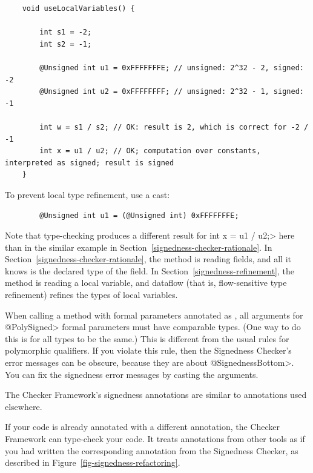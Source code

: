 \begin{Verbatim}
    void useLocalVariables() {

        int s1 = -2;
        int s2 = -1;

        @Unsigned int u1 = 0xFFFFFFFE; // unsigned: 2^32 - 2, signed: -2
        @Unsigned int u2 = 0xFFFFFFFF; // unsigned: 2^32 - 1, signed: -1

        int w = s1 / s2; // OK: result is 2, which is correct for -2 / -1
        int x = u1 / u2; // OK; computation over constants, interpreted as signed; result is signed
    }
\end{Verbatim}

To prevent local type refinement, use a cast:
\begin{Verbatim}
        @Unsigned int u1 = (@Unsigned int) 0xFFFFFFFE;
\end{Verbatim}

Note that type-checking produces a different result for \<int x = u1 / u2;>
here than in the similar example in
Section~\ref{signedness-checker-rationale}.  In
Section~\ref{signedness-checker-rationale}, the method is reading fields,
and all it knows is the declared type of the field.  In
Section~\ref{signedness-refinement}, the method is
reading a local variable, and dataflow (that is, flow-sensitive type
refinement) refines the types of local variables.



When calling a method with formal parameters annotated as
, all arguments for
\<@PolySigned> formal parameters must have comparable types.  (One way to
do this is for all types to be the same.)  This is different from the usual
rules for polymorphic qualifiers.  If you violate this rule, then the
Signedness Checker's error messages can be obscure, because they are about
\<@SignednessBottom>.  You can fix the signedness error messages by casting
the arguments.



The Checker Framework's signedness annotations are similar to annotations used
elsewhere.

If your code is already annotated with a different
annotation, the Checker Framework can type-check your code.
It treats annotations from other tools
as if you had written the corresponding annotation from the
Signedness Checker, as described in Figure~\ref{fig-signedness-refactoring}.


